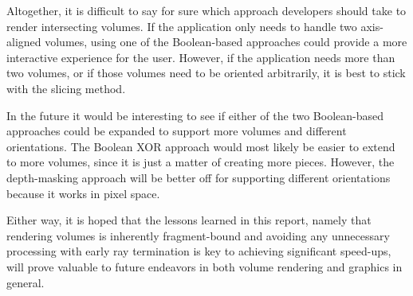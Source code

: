 \documentclass{report}
\begin{document}
Altogether, it is difficult to say for sure which approach developers should
take to render intersecting volumes.  If the application only needs to handle
two axis-aligned volumes, using one of the Boolean-based approaches could
provide a more interactive experience for the user.  However, if the application
needs more than two volumes, or if those volumes need to be oriented
arbitrarily, it is best to stick with the slicing method.

In the future it would be interesting to see if either of the two Boolean-based
approaches could be expanded to support more volumes and different orientations.
The Boolean XOR approach would most likely be easier to extend to more volumes,
since it is just a matter of creating more pieces.  However, the depth-masking
approach will be better off for supporting different orientations because it
works in pixel space.

Either way, it is hoped that the lessons learned in this report, namely that
rendering volumes is inherently fragment-bound and avoiding any unnecessary
processing with early ray termination is key to achieving significant speed-ups,
will prove valuable to future endeavors in both volume rendering and graphics in
general.


\newpage


\end{document}
